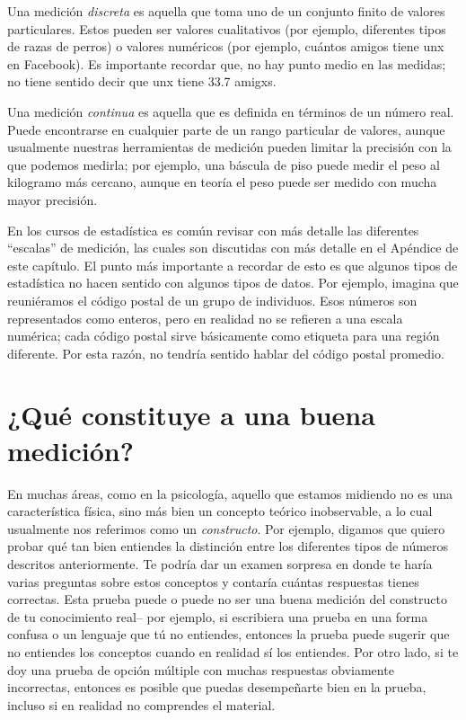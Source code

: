 \documentclass[
  12pt,
]{book}
\begin{document}
Una medición \emph{discreta} es aquella que toma uno de un conjunto finito de valores particulares. Estos pueden ser valores cualitativos (por ejemplo, diferentes tipos de razas de perros) o valores numéricos (por ejemplo, cuántos amigos tiene unx en Facebook). Es importante recordar que, no hay punto medio en las medidas; no tiene sentido decir que unx tiene 33.7 amigxs.

Una medición \emph{continua} es aquella que es definida en términos de un número real. Puede encontrarse en cualquier parte de un rango particular de valores, aunque usualmente nuestras herramientas de medición pueden limitar la precisión con la que podemos medirla; por ejemplo, una báscula de piso puede medir el peso al kilogramo más cercano, aunque en teoría el peso puede ser medido con mucha mayor precisión.

En los cursos de estadística es común revisar con más detalle las diferentes ``escalas'' de medición, las cuales son discutidas con más detalle en el Apéndice de este capítulo. El punto más importante a recordar de esto es que algunos tipos de estadística no hacen sentido con algunos tipos de datos. Por ejemplo, imagina que reuniéramos el código postal de un grupo de individuos. Esos números son representados como enteros, pero en realidad no se refieren a una escala numérica; cada código postal sirve básicamente como etiqueta para una región diferente. Por esta razón, no tendría sentido hablar del código postal promedio.

\hypertarget{quuxe9-constituye-a-una-buena-mediciuxf3n}{%
\section{¿Qué constituye a una buena medición?}\label{quuxe9-constituye-a-una-buena-mediciuxf3n}}

En muchas áreas, como en la psicología, aquello que estamos midiendo no es una característica física, sino más bien un concepto teórico inobservable, a lo cual usualmente nos referimos como un \emph{constructo}. Por ejemplo, digamos que quiero probar qué tan bien entiendes la distinción entre los diferentes tipos de números descritos anteriormente. Te podría dar un examen sorpresa en donde te haría varias preguntas sobre estos conceptos y contaría cuántas respuestas tienes correctas. Esta prueba puede o puede no ser una buena medición del constructo de tu conocimiento real-- por ejemplo, si escribiera una prueba en una forma confusa o un lenguaje que tú no entiendes, entonces la prueba puede sugerir que no entiendes los conceptos cuando en realidad sí los entiendes. Por otro lado, si te doy una prueba de opción múltiple con muchas respuestas obviamente incorrectas, entonces es posible que puedas desempeñarte bien en la prueba, incluso si en realidad no comprendes el material.
\end{document}
